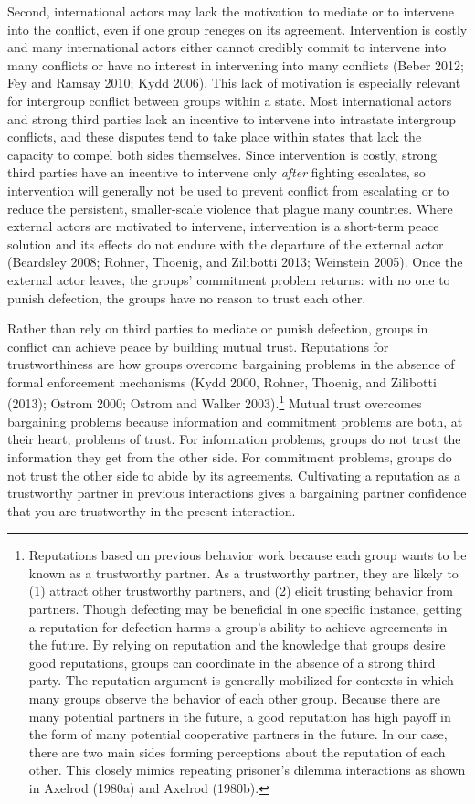 \documentclass[11pt]{article}
\begin{document}
Second, international actors may lack the motivation to mediate or to
intervene into the conflict, even if one group reneges on its agreement.
Intervention is costly and many international actors either cannot
credibly commit to intervene into many conflicts or have no interest in
intervening into many conflicts (Beber 2012; Fey and Ramsay 2010; Kydd
2006). This lack of motivation is especially relevant for intergroup
conflict between groups within a state. Most international actors and
strong third parties lack an incentive to intervene into intrastate
intergroup conflicts, and these disputes tend to take place within
states that lack the capacity to compel both sides themselves. Since
intervention is costly, strong third parties have an incentive to
intervene only \emph{after} fighting escalates, so intervention will
generally not be used to prevent conflict from escalating or to reduce
the persistent, smaller-scale violence that plague many countries. Where
external actors are motivated to intervene, intervention is a short-term
peace solution and its effects do not endure with the departure of the
external actor (Beardsley 2008; Rohner, Thoenig, and Zilibotti 2013;
Weinstein 2005). Once the external actor leaves, the groups' commitment
problem returns: with no one to punish defection, the groups have no
reason to trust each other.

Rather than rely on third parties to mediate or punish defection, groups
in conflict can achieve peace by building mutual trust. Reputations for
trustworthiness are how groups overcome bargaining problems in the
absence of formal enforcement mechanisms (Kydd 2000, Rohner, Thoenig,
and Zilibotti (2013); Ostrom 2000; Ostrom and Walker 2003).\footnote{Reputations
  based on previous behavior work because each group wants to be known
  as a trustworthy partner. As a trustworthy partner, they are likely to
  (1) attract other trustworthy partners, and (2) elicit trusting
  behavior from partners. Though defecting may be beneficial in one
  specific instance, getting a reputation for defection harms a group's
  ability to achieve agreements in the future. By relying on reputation
  and the knowledge that groups desire good reputations, groups can
  coordinate in the absence of a strong third party. The reputation
  argument is generally mobilized for contexts in which many groups
  observe the behavior of each other group. Because there are many
  potential partners in the future, a good reputation has high payoff in
  the form of many potential cooperative partners in the future. In our
  case, there are two main sides forming perceptions about the
  reputation of each other. This closely mimics repeating prisoner's
  dilemma interactions as shown in Axelrod (1980a) and Axelrod (1980b).}
Mutual trust overcomes bargaining problems because information and
commitment problems are both, at their heart, problems of trust. For
information problems, groups do not trust the information they get from
the other side. For commitment problems, groups do not trust the other
side to abide by its agreements. Cultivating a reputation as a
trustworthy partner in previous interactions gives a bargaining partner
confidence that you are trustworthy in the present interaction.
\end{document}
